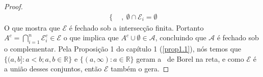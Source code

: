 \begin{proposicao}
\begin{proof}
\begin{align*}
\begin{cases}
                \end{cases}     \ , \ \emptyset \cap \mathcal{E}_i = \emptyset
        \end{align*}
        O que mostra que $\mathcal{E}$ é fechado sob a intersecção finita. Portanto $A^c = \bigcap _{i=1} ^n \mathcal{E}_i ^c \in \mathcal{E}$ o que implica que $A^c \cup \emptyset \in \mathcal{A}$, concluindo que $\mathcal{A}$ é fechado sob o complementar. 
        Pela Proposição 1 do capítulo 1 (\ref{prop1.1}), nós temos que $\{(a,b]: a<b ; a,b \in \mathbb{R}\}$ e $\{(a,\infty): a \in \mathbb{R}\}$ geram a \sig \ de Borel na reta, e como $\mathcal{E}$ é a união desses conjuntos, então $\mathcal{E}$ também o gera.
        
    \end{proof}
    
\end{proposicao}

